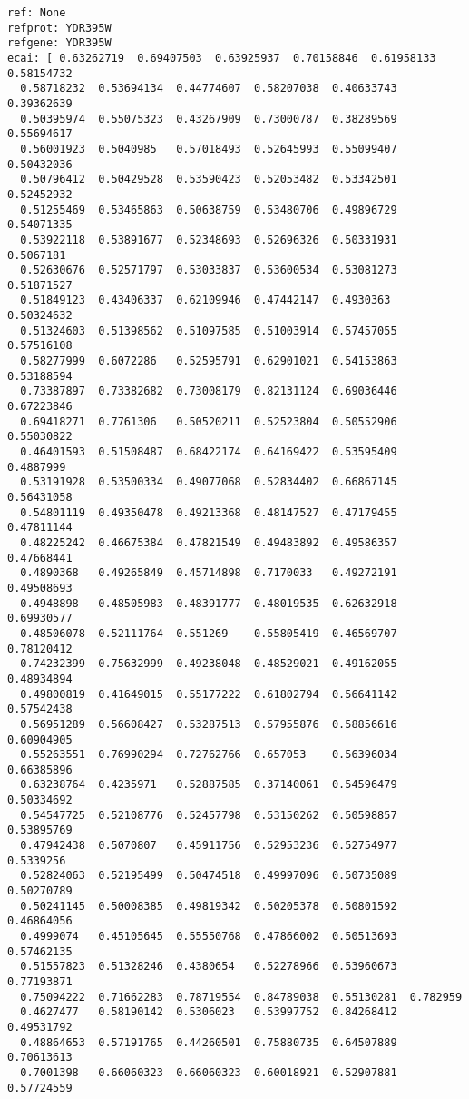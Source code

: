 \documentclass[11pt]{article}
\begin{document}
\begin{Verbatim}[commandchars=\\\{\}]
ref: None
refprot: YDR395W
refgene: YDR395W
ecai: [ 0.63262719  0.69407503  0.63925937  0.70158846  0.61958133  0.58154732
  0.58718232  0.53694134  0.44774607  0.58207038  0.40633743  0.39362639
  0.50395974  0.55075323  0.43267909  0.73000787  0.38289569  0.55694617
  0.56001923  0.5040985   0.57018493  0.52645993  0.55099407  0.50432036
  0.50796412  0.50429528  0.53590423  0.52053482  0.53342501  0.52452932
  0.51255469  0.53465863  0.50638759  0.53480706  0.49896729  0.54071335
  0.53922118  0.53891677  0.52348693  0.52696326  0.50331931  0.5067181
  0.52630676  0.52571797  0.53033837  0.53600534  0.53081273  0.51871527
  0.51849123  0.43406337  0.62109946  0.47442147  0.4930363   0.50324632
  0.51324603  0.51398562  0.51097585  0.51003914  0.57457055  0.57516108
  0.58277999  0.6072286   0.52595791  0.62901021  0.54153863  0.53188594
  0.73387897  0.73382682  0.73008179  0.82131124  0.69036446  0.67223846
  0.69418271  0.7761306   0.50520211  0.52523804  0.50552906  0.55030822
  0.46401593  0.51508487  0.68422174  0.64169422  0.53595409  0.4887999
  0.53191928  0.53500334  0.49077068  0.52834402  0.66867145  0.56431058
  0.54801119  0.49350478  0.49213368  0.48147527  0.47179455  0.47811144
  0.48225242  0.46675384  0.47821549  0.49483892  0.49586357  0.47668441
  0.4890368   0.49265849  0.45714898  0.7170033   0.49272191  0.49508693
  0.4948898   0.48505983  0.48391777  0.48019535  0.62632918  0.69930577
  0.48506078  0.52111764  0.551269    0.55805419  0.46569707  0.78120412
  0.74232399  0.75632999  0.49238048  0.48529021  0.49162055  0.48934894
  0.49800819  0.41649015  0.55177222  0.61802794  0.56641142  0.57542438
  0.56951289  0.56608427  0.53287513  0.57955876  0.58856616  0.60904905
  0.55263551  0.76990294  0.72762766  0.657053    0.56396034  0.66385896
  0.63238764  0.4235971   0.52887585  0.37140061  0.54596479  0.50334692
  0.54547725  0.52108776  0.52457798  0.53150262  0.50598857  0.53895769
  0.47942438  0.5070807   0.45911756  0.52953236  0.52754977  0.5339256
  0.52824063  0.52195499  0.50474518  0.49997096  0.50735089  0.50270789
  0.50241145  0.50008385  0.49819342  0.50205378  0.50801592  0.46864056
  0.4999074   0.45105645  0.55550768  0.47866002  0.50513693  0.57462135
  0.51557823  0.51328246  0.4380654   0.52278966  0.53960673  0.77193871
  0.75094222  0.71662283  0.78719554  0.84789038  0.55130281  0.782959
  0.4627477   0.58190142  0.5306023   0.53997752  0.84268412  0.49531792
  0.48864653  0.57191765  0.44260501  0.75880735  0.64507889  0.70613613
  0.7001398   0.66060323  0.66060323  0.60018921  0.52907881  0.57724559

\end{Verbatim}
\end{document}
